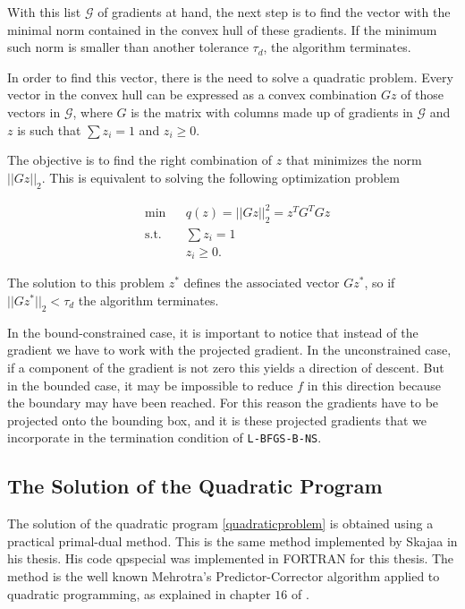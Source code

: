 With this list $\mathcal{G}$ of gradients at hand, the next step is to find the vector with the minimal norm contained in the convex hull of these gradients. If the minimum such norm is smaller than another tolerance $\tau_d$, the algorithm terminates.

In order to find this vector, there is the need to solve a quadratic problem. Every vector in the convex hull can be expressed as a convex combination $Gz$ of those vectors in $\mathcal{G}$, where $G$ is the matrix with columns made up of gradients in $\mathcal{G}$ and $z$ is such that $\sum z_i = 1$ and $z_i \geq 0$.

The objective is to find the right combination of $z$ that minimizes the norm $||Gz||_2$.  This is equivalent to solving the following optimization problem

\begin{equation} \label{quadraticproblem}
  \begin{aligned}
    & {\text{min}}
    & & q(z) = ||G z ||_2^2 = z^TG^TGz  \\
    & \text{s.t.}
    & & \sum z_i = 1 \; \\
    & & & z_i \geq 0.
  \end{aligned}
\end{equation}

The solution to this problem $z^*$ defines the associated vector $Gz^*$, so if $||Gz^*||_2 < \tau_d$ the algorithm terminates.

In the bound-constrained case, it is important to notice that instead of the gradient we have to work with the projected gradient. In the unconstrained case, if a component of the gradient is not zero this yields a direction of descent. But in the bounded case, it may be impossible to reduce $f$ in this direction because the boundary may have been reached. For this reason the gradients have to be projected onto the bounding box, and it is these projected gradients that we incorporate in the termination condition of \texttt{L-BFGS-B-NS}.

\subsection{The Solution of the Quadratic Program}

The solution of the quadratic program \eqref{quadraticproblem} is obtained using a practical primal-dual method. This is the same method implemented by Skajaa \citep{skajaa} in his thesis. His code \textsf{qpspecial} was implemented in \textsc{FORTRAN} for this thesis. The method is the well known Mehrotra's Predictor-Corrector algorithm applied to quadratic programming, as explained in chapter $16$ of \citep{nocedal}.

